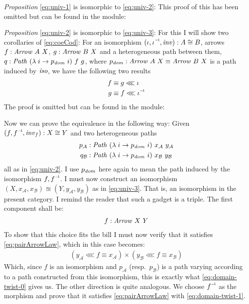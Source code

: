\emph{Proposition} \ref{eq:univ-1} is isomorphic to \ref{eq:univ-2}:
This proof of this has been omitted but can be found in the module:
%
\begin{center}%
\end{center}
%
\emph{Proposition} \ref{eq:univ-2} is isomorphic to \ref{eq:univ-3}: For this I
will show two corollaries of \ref{eq:coeCod}: For an isomorphism $(\iota,
\inv{\iota}, \var{inv}) \tp A \cong B$, arrows $f \tp \Arrow\ A\ X$, $g \tp
\Arrow\ B\ X$ and a heterogeneous path between them, $q \tp \Path\ (\lambda\; i
\to p_{\var{dom}}\ i)\ f\ g$, where $p_{\var{dom}} \tp \Arrow\ A\ X \equiv
\Arrow\ B\ X$ is a path induced by $\mathit{iso}$, we have the following two
results
%
\begin{align}
\label{eq:domain-twist-0}
f & \equiv g \lll \iota \\
\label{eq:domain-twist-1}
g & \equiv f \lll \inv{\iota}
\end{align}
%
The proof is omitted but can be found in the module:
\begin{center}
\end{center}

Now we can prove the equivalence in the following way: Given $(f, \inv{f},
\var{inv}_f) \tp X \cong Y$ and two heterogeneous paths
%
\begin{align*}
p_{\mathcal{A}} & \tp \Path\ (\lambda\; i \to p_{\var{dom}}\ i)\ x_{\mathcal{A}}\ y_{\mathcal{A}}\\
%
q_{\mathcal{B}} & \tp \Path\ (\lambda\; i \to p_{\var{dom}}\ i)\ x_{\mathcal{B}}\ y_{\mathcal{B}}
\end{align*}
%
all as in \ref{eq:univ-2}. I use $p_{\mathit{dom}}$ here again to mean the path
induced by the isomorphism $f, \inv{f}$. I must now construct an isomorphism
$(X, x_{\mathcal{A}}, x_{\mathcal{B}}) \approxeq (Y, y_{\mathcal{A}}, y_{\mathcal{B}})$
as in \ref{eq:univ-3}. That is, an isomorphism in the present category. I remind
the reader that such a gadget is a triple. The first component shall be:
%
\begin{align}
f \tp \Arrow\ X\ Y
\end{align}
%
To show that this choice fits the bill I must now verify that it satisfies
\ref{eq:pairArrowLaw}, which in this case becomes:
%
\begin{align}
(y_{\mathcal{A}} \lll f ≡ x_{\mathcal{A}}) × (y_{\mathcal{B}} \lll f ≡ x_{\mathcal{B}})
\end{align}
%
Which, since $f$ is an isomorphism and $p_{\mathcal{A}}$ (resp.\ $p_{\mathcal{B}}$)
is a path varying according to a path constructed from this isomorphism, this is
exactly what \ref{eq:domain-twist-0} gives us.
%
The other direction is quite analogous. We choose $\inv{f}$ as the morphism and
prove that it satisfies \ref{eq:pairArrowLaw} with \ref{eq:domain-twist-1}.


